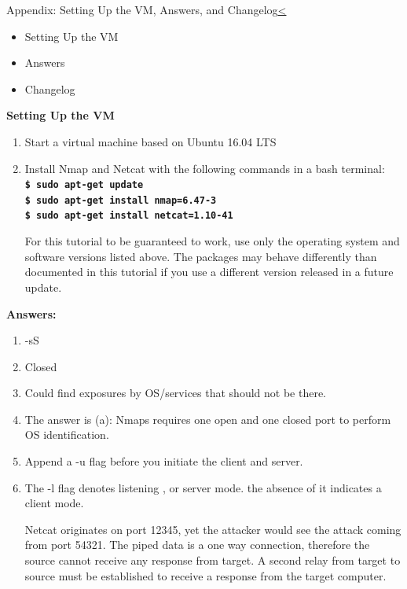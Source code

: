 \documentclass[12pt]{extarticle}
\newcommand{\code}[1]{\texttt{\bfseries#1}}
\newenvironment{instructionblock}{\Large\bgroup}{\egroup}
\begin{document}
\pagebreak

\begin{slide}{Appendix: Setting Up the VM, Answers, and Changelog}{\hyperref[slide 21]{\textless}}
\begin{instructionblock}
\begin{itemize}
	\item Setting Up the VM
	\item Answers	
	\item Changelog
\end{itemize}
\end{instructionblock}
\end{slide}

\textbf{Setting Up the VM}
	
\begin{enumerate}
	\item Start a virtual machine based on Ubuntu 16.04 LTS
	\item Install Nmap and Netcat with the following commands in a bash terminal:\\
		\code{\$ sudo apt-get update\\
		\$ sudo apt-get install nmap=6.47-3 \\
		\$ sudo apt-get install netcat=1.10-41}

For this tutorial to be guaranteed to work, use only the operating system and software versions listed above. The packages may behave differently than documented in this tutorial if you use a different version released in a future update.
\end{enumerate}

\textbf{Answers:}
\begin{enumerate}
		\item -sS
		\item Closed
		\item Could find exposures by OS/services that should not be there.
		\item The answer is (a): Nmaps requires one open and one closed port to perform OS identification.
	
		\item Append a -u flag before you initiate the client and server.
		\item  The -l flag denotes listening , or server mode. the absence of it indicates a client mode.

Netcat originates on port 12345, yet the attacker would see the attack coming from port 54321. The piped data is a one way connection, therefore the source cannot receive any response from target. A second relay from target to source must be established to receive a response from the target computer.\end{enumerate}
\end{document}
